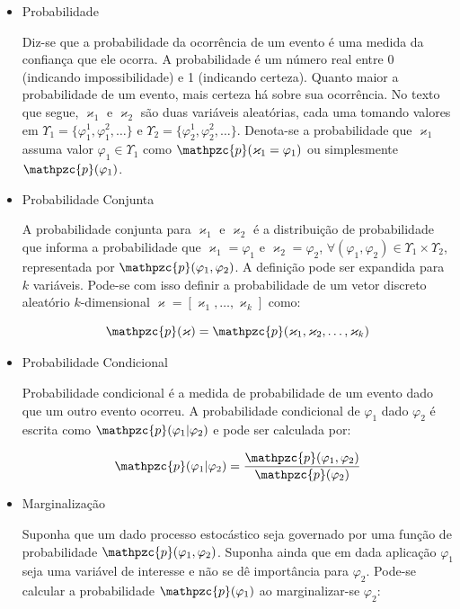 {\begin{itemize}
\item Probabilidade

Diz-se que a probabilidade da ocorrência de um evento é uma medida da confiança
que ele ocorra. A probabilidade é um número real entre 0 (indicando
impossibilidade) e 1 (indicando certeza). Quanto maior a probabilidade de um
evento, mais certeza há sobre sua ocorrência. No texto que segue, $\varkappa_1$
e $\varkappa_2$ são duas variáveis aleatórias, cada uma tomando valores em
$\Upsilon _1 = \{\varphi_1^1, \varphi_1^2, \ldots\}$ e $\Upsilon_2 =
\{\varphi_2^1, \varphi_2^2, \ldots\}$. Denota-se a probabilidade que
$\varkappa_1$ assuma valor $\varphi_1 \in \Upsilon_1$ como
$\mathpzc{p}(\varkappa_1 = \varphi_1)$ ou simplesmente $\mathpzc{p}(\varphi_1)$.

\item Probabilidade Conjunta

A probabilidade conjunta para $\varkappa_1$ e $\varkappa_2$ é a distribuição de
probabilidade que informa a probabilidade que $\varkappa_1 = \varphi_1$ e
$\varkappa_2 = \varphi_2$, $\forall (\varphi_1, \varphi_2) \in \Upsilon_1 \times
\Upsilon_2$, representada por $\mathpzc{p}(\varphi_1, \varphi_2)$. A definição
pode ser expandida para $k$ variáveis. Pode-se com isso definir a probabilidade
de um vetor discreto aleatório $k$-dimensional $\mathbf{\varkappa} =
[\varkappa_1, \ldots, \varkappa_k]$ como:

\begin{equation}
\mathpzc{p}(\mathbf{\varkappa}) = \mathpzc{p}(\varkappa_1, \varkappa_2, \ldots, \varkappa_k) 
\end{equation}

\item Probabilidade Condicional

Probabilidade condicional é a medida de probabilidade de um evento dado que um
outro evento ocorreu. A probabilidade condicional de $\varphi_1$ dado
$\varphi_2$ é escrita como $\mathpzc{p}(\varphi_1 | \varphi_2)$ e pode ser
calculada por:

\begin{equation}
\mathpzc{p}(\varphi_1 | \varphi_2) = \frac{\mathpzc{p}(\varphi_1, \varphi_2)}{\mathpzc{p}(\varphi_2)}
\end{equation}


\item Marginalização

Suponha que um dado processo estocástico seja governado por uma função de
probabilidade $\mathpzc{p}(\varphi_1,\varphi_2)$.  Suponha ainda que em dada
aplicação $\varphi_1$ seja uma variável de interesse e não se dê importância
para $\varphi_2$. Pode-se calcular a probabilidade $\mathpzc{p}(\varphi_1)$ ao
marginalizar-se $\varphi_2$:


\end{itemize}}
